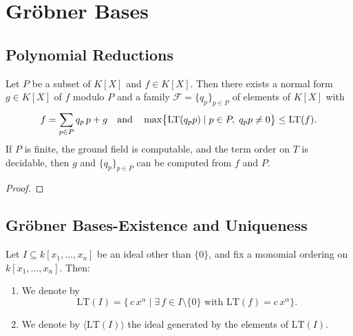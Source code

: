 \chapter{Gr{\"o}bner Bases} 

\section{Polynomial Reductions}

\begin{theorem}
\label{thm:div_alg}
  \leanok
  Let $P$ be a subset of $K[X]$ and $f\in K[X]$.
  Then there exists a normal form $g\in K[X]$ of $f$ modulo $P$ and a family $\mathcal{F}=\{q_{p}\}_{p\in P}$ of elements of $K[X]$ with
  \[
    f=\sum_{p\in P}q_{p}\,p + g
    \quad\text{and}\quad
    \max\bigl\{\operatorname{LT}(q_{p}p)\mid p\in P,\;q_{p}p\neq 0\bigr\}\le \operatorname{LT}(f).
  \]
  If $P$ is finite, the ground field is computable, and the term order on $T$ is decidable, 
  then $g$ and $\{q_{p}\}_{p\in P}$ can be computed from $f$ and $P$.
\end{theorem}
\begin{proof}
  \leanok 
\end{proof}

\section{Gr{\"o}bner Bases-Existence and Uniqueness}

\begin{definition}
  \label{def:initialIdeal}
  \leanok 
  Let \(I\subseteq k[x_1,\dots,x_n]\) be an ideal other than \(\{0\}\), and fix a monomial ordering on \(k[x_1,\dots,x_n]\).  Then:
  \begin{enumerate}
    \item We denote by
    \[
      \mathrm{LT}(I)
      =
      \{\,c\,x^\alpha \mid \exists\,f\in I\setminus\{0\}\text{ with }\mathrm{LT}(f)=c\,x^\alpha\}.
    \]
    \item We denote by \(\langle \mathrm{LT}(I)\rangle\) the ideal generated by the elements of \(\mathrm{LT}(I)\).
  \end{enumerate}
\end{definition}


